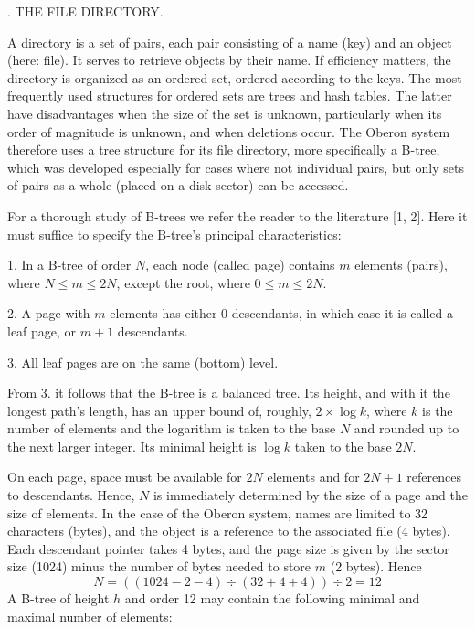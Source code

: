 . THE FILE DIRECTORY.

A directory is a set of pairs, each pair consisting of a name (key) and an object (here: file). It serves to retrieve objects by their name. If efficiency matters, the directory is organized as an ordered set, ordered according to the keys. The most frequently used structures for ordered sets are trees and hash tables. The latter have disadvantages when the size of the set is unknown, particularly when its order of magnitude is unknown, and when deletions occur. The Oberon system therefore uses a tree structure for its file directory, more specifically a B-tree, which was developed especially for cases where not individual pairs, but only sets of pairs as a whole (placed on a disk sector) can be accessed.

For a thorough study of B-trees we refer the reader to the literature [1, 2]. Here it must suffice to specify the B-tree's principal characteristics:

1. In a B-tree of order $N$, each node (called page) contains $m$ elements (pairs), where $N \le m \le 2N$, except the root, where $0 \le m \le 2N$.

2. A page with $m$ elements has either 0 descendants, in which case it is called a leaf page, or $m + 1$ descendants.

3. All leaf pages are on the same (bottom) level.

From 3. it follows that the B-tree is a balanced tree. Its height, and with it the longest path's length, has an upper bound of, roughly, $2 \times \log{k}$, where $k$ is the number of elements and the logarithm is taken to the base $N$ and rounded up to the next larger integer. Its minimal height is $\log{k}$ taken to the base $2N$.

On each page, space must be available for $2N$ elements and for $2N + 1$ references to descendants. Hence, $N$ is immediately determined by the size of a page and the size of elements. In the case of the Oberon system, names are limited to 32 characters (bytes), and the object is a reference to the associated file (4 bytes). Each descendant pointer takes 4 bytes, and the page size is given by the sector size (1024) minus the number of bytes needed to store $m$ (2 bytes). Hence
$$N = ((1024 - 2 - 4) \div (32 + 4 + 4)) \div 2 = 12$$
A B-tree of height $h$ and order 12 may contain the following minimal and maximal number of elements:

\medskip{}\medskip

